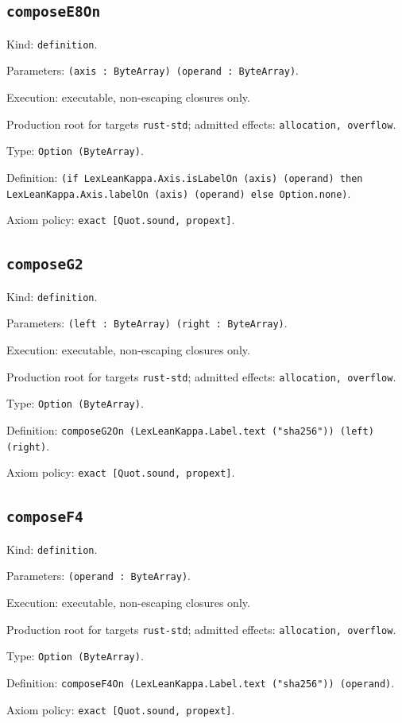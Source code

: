 \documentclass[11pt]{article}
\begin{document}
\subsection*{\texttt{composeE8On}}
\noindent Kind: \texttt{definition}.\par
\noindent Parameters: \texttt{(axis : ByteArray) (operand : ByteArray)}.\par
\noindent Execution: executable, non-escaping closures only.\par
\noindent Production root for targets \texttt{rust-std}; admitted effects: \texttt{allocation, overflow}.\par
\noindent Type: \texttt{Option (ByteArray)}.\par
\noindent Definition: \texttt{(if LexLeanKappa.Axis.isLabelOn (axis) (operand) then LexLeanKappa.Axis.labelOn (axis) (operand) else Option.none)}.\par
\noindent Axiom policy: \texttt{exact [Quot.sound, propext]}.\par
\subsection*{\texttt{composeG2}}
\noindent Kind: \texttt{definition}.\par
\noindent Parameters: \texttt{(left : ByteArray) (right : ByteArray)}.\par
\noindent Execution: executable, non-escaping closures only.\par
\noindent Production root for targets \texttt{rust-std}; admitted effects: \texttt{allocation, overflow}.\par
\noindent Type: \texttt{Option (ByteArray)}.\par
\noindent Definition: \texttt{composeG2On (LexLeanKappa.Label.text ("sha256")) (left) (right)}.\par
\noindent Axiom policy: \texttt{exact [Quot.sound, propext]}.\par
\subsection*{\texttt{composeF4}}
\noindent Kind: \texttt{definition}.\par
\noindent Parameters: \texttt{(operand : ByteArray)}.\par
\noindent Execution: executable, non-escaping closures only.\par
\noindent Production root for targets \texttt{rust-std}; admitted effects: \texttt{allocation, overflow}.\par
\noindent Type: \texttt{Option (ByteArray)}.\par
\noindent Definition: \texttt{composeF4On (LexLeanKappa.Label.text ("sha256")) (operand)}.\par
\noindent Axiom policy: \texttt{exact [Quot.sound, propext]}.\par
\end{document}

